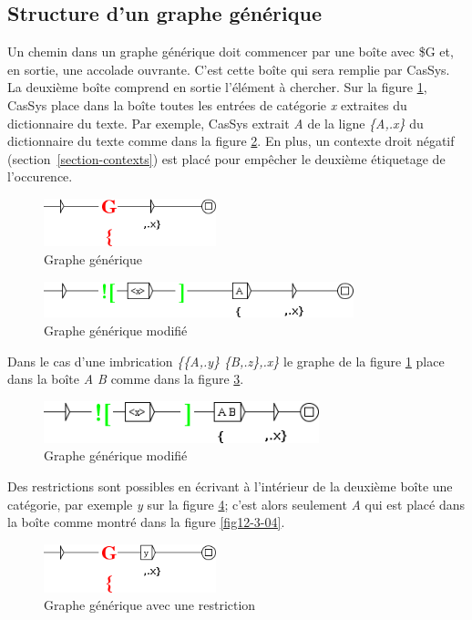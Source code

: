 \subsection{Structure d'un graphe g\'{e}n\'{e}rique}
Un chemin dans un graphe g\'{e}n\'{e}rique doit commencer par une bo\^{i}te avec \$G et, en sortie, une accolade ouvrante. C'est cette bo\^{i}te qui sera remplie par CasSys. La deuxi\`{e}me bo\^{i}te comprend en sortie l'\'{e}l\'{e}ment \`{a} chercher. Sur la figure \ref{fig12-3-01}, CasSys place dans la bo\^{i}te toutes les entr\'{e}es de cat\'{e}gorie \textit{x} extraites du dictionnaire du texte. Par exemple, CasSys extrait \textit{A} de la ligne \emph{\{A,.x\}} du dictionnaire du texte comme dans la figure \ref{fig12-3-01a}. En plus, un contexte droit n\'{e}gatif (section~\ref{section-contexts}) est plac\'{e} pour emp\^{e}cher le  deuxi\`{e}me \'{e}tiquetage de l'occurence.
\begin{figure}[!htb]
  \centering
  \includegraphics[width=5cm]{resources/img/fig12-3-01.png}
  \caption{Graphe g\'{e}n\'{e}rique}
  \label{fig12-3-01}
\end{figure}
\begin{figure}[!htb]
  \centering
  \includegraphics[width=9cm]{resources/img/fig12-3-01a.png}
  \caption{Graphe g\'{e}n\'{e}rique modifi\'{e}}
  \label{fig12-3-01a}
\end{figure}


Dans le cas d'une imbrication \emph{\{\{A,.y\} \{B,.z\},.x\}} le graphe de la figure \ref{fig12-3-01} place dans la bo\^{i}te \textit{A B} comme dans la figure \ref{fig12-3-02}.
\begin{figure}[!htb]
  \centering
  \includegraphics[width=8cm]{resources/img/fig12-3-02.png}
  \caption{Graphe g\'{e}n\'{e}rique modifi\'{e}}
  \label{fig12-3-02}
\end{figure}

\noindent Des restrictions sont possibles en \'{e}crivant \`{a} l'int\'{e}rieur de la deuxi\`{e}me bo\^{i}te une cat\'{e}gorie, par exemple \textit{y} sur la figure \ref{fig12-3-03}; c'est alors seulement \textit{A} qui est placé dans la bo\^{i}te comme montr\'{e} dans la figure \ref{fig12-3-04}.
\begin{figure}[!htb]
  \centering
  \includegraphics[width=5cm]{resources/img/fig12-3-03.png}
  \caption{Graphe g\'{e}n\'{e}rique avec une restriction}
  \label{fig12-3-03}
\end{figure}

